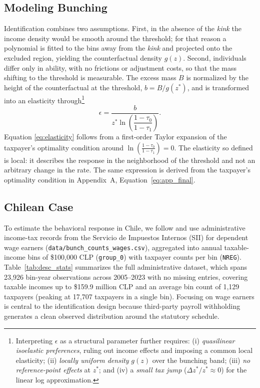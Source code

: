 \subsection{Modeling Bunching}\label{sec:modeling_bunching}
Identification combines two assumptions. First, in the absence of the \textit{kink}  the income density would be smooth around the threshold; for that reason a polynomial is fitted to the bins away from the \textit{kink} and projected onto the excluded region, yielding the counterfactual density $g(z)$. Second, individuals differ only in ability, with no frictions or adjustment costs, so that the mass shifting to the threshold is measurable. The excess mass $B$ is normalized by the height of the counterfactual at the threshold, $b=B/g(z^*)$, and is transformed into an elasticity through\footnote{Interpreting $\epsilon$ as a structural parameter further requires: (i) \emph{quasilinear isoelastic preferences}, ruling out income effects and imposing a common local elasticity; (ii) \emph{locally uniform density} $g(z)$ over the bunching band; (iii) \emph{no reference-point effects} at $z^*$; and (iv) a \emph{small tax jump} ($\Delta z^*/z^* \approx 0$) for the linear log approximation.}
\begin{equation}\label{eq:elasticity}
\epsilon = \frac{b}{z^* \ln\left(\dfrac{1-\tau_0}{1-\tau_1}\right)}.
\end{equation}
Equation \ref{eq:elasticity} follows from a first-order Taylor expansion of the taxpayer's optimality condition around $\ln\left(\frac{1-\tau_0}{1-\tau_1}\right)=0$. The elasticity so defined is local: it describes the response in the neighborhood of the threshold and not an arbitrary change in the rate. The same expression is derived from the taxpayer's optimality condition in Appendix~A, Equation~\ref{eq:app_final}.

\subsection{Chilean Case}
To estimate the behavioral response in Chile, we follow \cite{gutierrezNoExemption} and use administrative income-tax records from the Servicio de Impuestos Internos (SII) for dependent wage earners (\texttt{data/bunch\_counts\_wages.csv}), aggregated into annual taxable-income bins of \$100,000 CLP (\texttt{group\_0}) with taxpayer counts per bin (\texttt{NREG}). Table~\ref{tab:desc_stats} summarizes the full administrative dataset, which spans 23,926 bin-year observations across 2005--2023 with no missing entries, covering taxable incomes up to \$159.9 million CLP and an average bin count of 1,129 taxpayers (peaking at 17,707 taxpayers in a single bin). Focusing on wage earners is central to the identification design because third-party payroll withholding generates a clean observed distribution around the statutory schedule.

